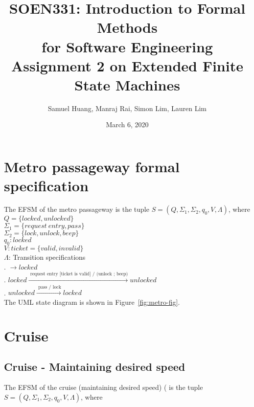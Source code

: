\documentclass[12pt]{article}
\title{SOEN331: Introduction to Formal Methods\\for Software Engineering\\
Assignment 2 on Extended Finite State Machines}
\author{Samuel Huang, Manraj Rai, Simon Lim, Lauren Lim}
\date{March 6, 2020}
\begin{document}
\begin{spacing}{1.5}

\maketitle

\section{Metro passageway formal specification}

\noindent The EFSM of the metro passageway is the tuple $S = (Q, \Sigma_1, \Sigma_2, q_0, V, \Lambda)$, where\\

\noindent $Q = \{locked, unlocked\}$\\
\noindent $\Sigma_1 = \{request~entry, pass\}$\\
\noindent $\Sigma_2 = \{lock, unlock, beep\}$\\
\noindent $q_0: locked$\\
\noindent $V: ticket = \{valid, invalid\}$\\
\noindent $\Lambda$: Transition specifications\\
. $\rightarrow locked$\\
. $locked \xrightarrow {\text { request entry [ticket is valid] / (unlock ; beep)}} unlocked$\\
. $unlocked \xrightarrow {\text { pass / lock}} locked$\\

\noindent The UML state diagram is shown in Figure~\ref{fig:metro-fig}.

\newpage

\section{Cruise}
\subsection{Cruise - Maintaining desired speed}

\noindent The EFSM of the cruise (maintaining desired speed) ( is the tuple $S = (Q, \Sigma_1, \Sigma_2, q_0, V, \Lambda)$, where\\


\end{spacing}
\end{document}
